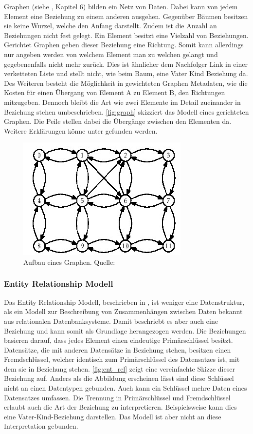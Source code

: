 \documentclass[a4paper]{article}
\begin{document}
	Graphen (siehe \cite{FundData}, Kapitel 6) bilden ein Netz von Daten. Dabei
	kann von jedem Element eine Beziehung zu einem anderen ausgehen. Gegenüber
	Bäumen besitzen sie keine Wurzel, welche den Anfang darstellt. Zudem ist die
	Anzahl an Beziehungen nicht fest gelegt. Ein Element besitzt eine Vielzahl von
	Beziehungen. Gerichtet Graphen geben dieser Beziehung eine Richtung.
	Somit kann allerdings nur angeben werden von welchem Element man zu welchen
	gelangt und gegebenenfalls nicht mehr zurück. Dies ist ähnlicher dem 
	Nachfolger Link in einer verketteten Liste und stellt nicht,
	wie beim Baum, eine Vater Kind Beziehung da. Des Weiteren besteht die
	Möglichkeit in gewichteten Graphen Metadaten, wie die Kosten für einen
	Übergang von Element A zu Element B, den Richtungen mitzugeben. Dennoch bleibt
	die Art wie zwei Elemente im Detail zueinander in Beziehung stehen	
	umbeschrieben. \autoref{fig:graph} skizziert das Modell eines gerichteten
	Graphen. Die Peile stellen dabei die Übergänge zwischen den Elementen da.
	Weitere Erklärungen könne unter \cite{Graph} gefunden werden. 

	\begin{figure}[H] 
		\centerline{
			\includegraphics{../Bilder/graph.jpg}
		}
		\caption{Aufbau eines Graphen. Quelle: \cite{Graph}}
		\label{fig:graph}
	\end{figure}
	
	\subsubsection{Entity Relationship Modell}
	
	Das Entity Relationship Modell, beschrieben in \cite{EntRel}, ist weniger
	eine Datenstruktur, als ein Modell zur Beschreibung von Zusammenhängen zwischen
	Daten bekannt aus relationalen Datenbanksysteme. Damit beschriebt es aber
	auch eine Beziehung und kann somit als Grundlage herangezogen werden. Die
	Beziehungen basieren darauf, dass jedes Element einen eindeutige 
	Primärschlüssel besitzt. Datensätze, die mit anderen Datensätze in Beziehung 
	stehen, besitzen einen Fremdschlüssel, welcher identisch zum Primärschlüssel
	des Datensatzes ist, mit dem sie in Beziehung stehen. \autoref{fig:ent_rel}
	zeigt eine vereinfachte Skizze dieser Beziehung auf. Anders als die Abbildung
	erscheinen lässt sind diese Schlüssel nicht an einen Datentypen gebunden. Auch
	kann ein Schlüssel mehre Daten eines Datensatzes umfassen. Die Trennung
	in Primärschlüssel und Fremdschlüssel erlaubt auch die Art der Beziehung zu
	interpretieren. Beispielsweise kann dies eine Vater-Kind-Beziehung darstellen.
	Das Modell ist aber nicht an diese Interpretation gebunden.
	
\end{document}
